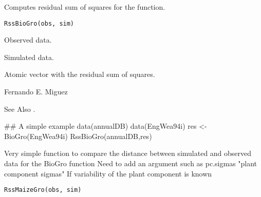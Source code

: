 \documentclass[letterpaper]{book}
\begin{document}
%
\begin{Description}\relax
Computes residual sum of squares for the
 function.
\end{Description}
%
\begin{Usage}
\begin{verbatim}
RssBioGro(obs, sim)
\end{verbatim}
\end{Usage}
%
\begin{Arguments}
\begin{ldescription}
\item[\code{obs}] Observed data.

\item[\code{sim}] Simulated data.
\end{ldescription}
\end{Arguments}
%
\begin{Value}
Atomic vector with the residual sum of squares.
\end{Value}
%
\begin{Author}\relax
Fernando E. Miguez
\end{Author}
%
\begin{SeeAlso}\relax
See Also .
\end{SeeAlso}
%
\begin{Examples}
\begin{ExampleCode}
## A simple example
data(annualDB)
data(EngWea94i)
res <- BioGro(EngWea94i)
RssBioGro(annualDB,res)
\end{ExampleCode}
\end{Examples}
%
\begin{Description}\relax
Very simple function to compare the distance between
simulated and observed data for the BioGro function Need to
add an argument such as pc.sigmas "plant component sigmas"
If variability of the plant component is known
\end{Description}
%
\begin{Usage}
\begin{verbatim}
RssMaizeGro(obs, sim)
\end{verbatim}
\end{Usage}
\end{document}
